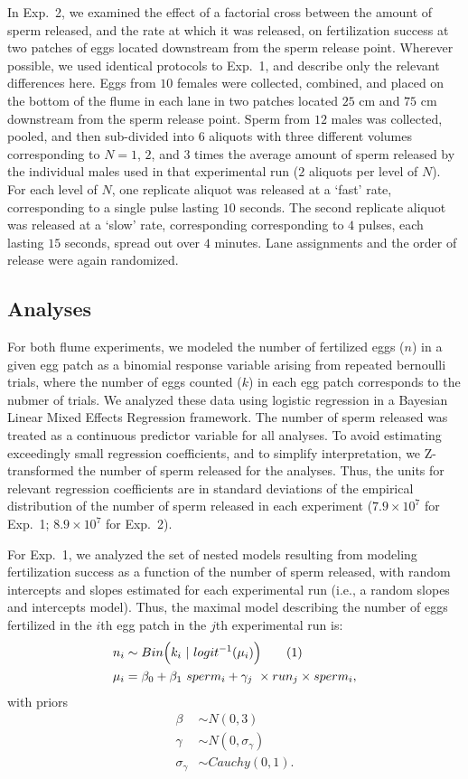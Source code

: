 \documentclass{article}
\newcommand\numberthis{\addtocounter{equation}{1}\tag{\theequation}}
\begin{document}
	In Exp.~2, we examined the effect of a factorial cross between the amount of sperm released, and the rate at which it was released, on fertilization success at two patches of eggs located downstream from the sperm release point. Wherever possible, we used identical protocols to Exp.~1, and describe only the relevant differences here. Eggs from $10$ females were collected, combined, and placed on the bottom of the flume in each lane in two patches located $25$ cm and $75$ cm downstream from the sperm release point. Sperm from $12$ males was collected, pooled, and then sub-divided into $6$ aliquots with three different volumes corresponding to $N = 1$, $2$, and $3$ times the average amount of sperm released by the individual males used in that experimental run ($2$ aliquots per level of $N$). For each level of $N$, one replicate aliquot was released at a `fast' rate, corresponding to a single pulse lasting $10$ seconds. The second replicate aliquot was released at a `slow' rate, corresponding corresponding to $4$ pulses, each lasting $15$ seconds, spread out over $4$ minutes. Lane assignments and the order of release were again randomized.


	\subsection*{Analyses}
	For both flume experiments, we modeled the number of fertilized eggs ($n$) in a given egg patch as a binomial response variable arising from repeated bernoulli trials, where the number of eggs counted ($k$) in each egg patch corresponds to the nubmer of trials. We analyzed these data using logistic regression in a Bayesian Linear Mixed Effects Regression framework. The number of sperm released was treated as a continuous predictor variable for all analyses. To avoid estimating exceedingly small regression coefficients, and to simplify interpretation, we Z-transformed the number of sperm released for the analyses. Thus, the units for relevant regression coefficients are in standard deviations of the empirical distribution of the number of sperm released in each experiment ($7.9 \times 10^{7}$ for Exp.~1; $8.9 \times 10^{7}$ for Exp.~2). 

	For Exp.~1, we analyzed the set of nested models resulting from modeling fertilization success as a function of the number of sperm released, with random intercepts and slopes estimated for each experimental run (i.e., a random slopes and intercepts model). Thus, the maximal model describing the number of eggs fertilized in the $i$th egg patch in the $j$th experimental run is:
\begin{align*}
	n_i   &\sim Bin\Big(k_i~|~logit^{-1}(\mu_i)\Big) \numberthis\\
	\mu_i &= \beta_0 + \beta_1~sperm_i + \gamma_{j}~\times run_j \times sperm_i,
\end{align*}
\noindent{} with priors
\begin{align*}
	\beta           &\sim N(0,3) \\
	\gamma          &\sim N(0,\sigma_{\gamma}) \\
	\sigma_{\gamma} &\sim Cauchy(0,1).
\end{align*}
\end{document}
